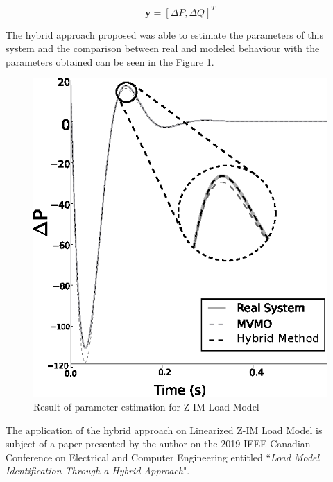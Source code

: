 \begin{apendicesenv}
\begin{equation}
	\mathbf{y} = [\Delta P, \Delta Q]^{T}
	\label{eq: ZIMoutput}
\end{equation}

The hybrid approach proposed was able to estimate the parameters of this system and the comparison between real and modeled behaviour with the parameters obtained can be seen in the Figure \ref{fig: ZIM}.

\begin{figure}[h]
	\caption{Result of parameter estimation for Z-IM Load Model}
	\begin{center}
		\includegraphics[scale=1]{Images/ZIM.eps}
	\end{center}
	\label{fig: ZIM}
\end{figure}

The application of the hybrid approach on Linearized Z-IM Load Model is subject of a paper presented by the author on the 2019 IEEE Canadian Conference on Electrical and Computer Engineering entitled ``\textit{Load Model Identification Through a Hybrid Approach}".
\end{apendicesenv}